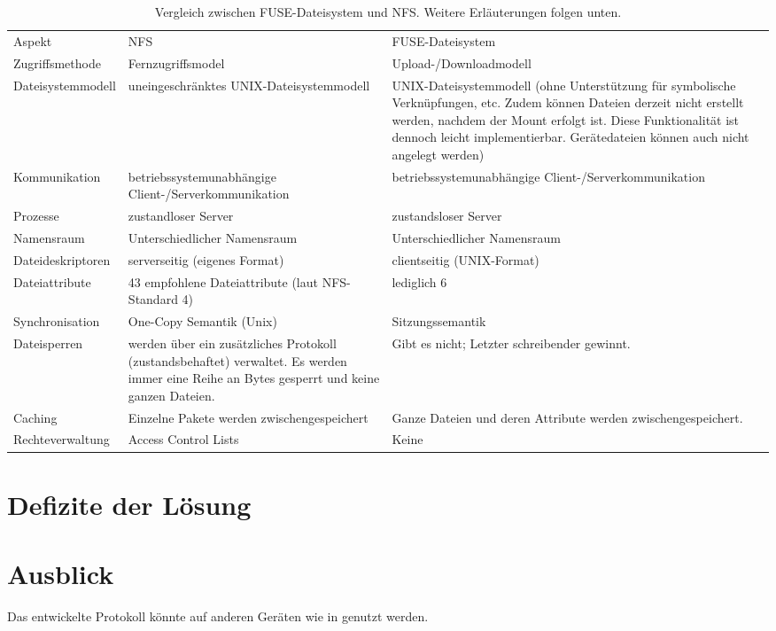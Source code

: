 \documentclass[
	10pt,			%
	a4paper,		%
	parskip=half,		%
	DIV=4,			%
	captions=nooneline,	%
	tablecaptionabove,	%
	bibliography=totoc,	%
	bibtotocnumbered,	%
	liststotocnumbered,	%
	headinclude,
	headsepline,		%
	1.6headlines,		%
	]
	{book}
\begin{document}
\begin{table}[H]
	\begin{tabu} to 
		\tableHeaderStyle
		Aspekt & NFS & FUSE-Dateisystem \\
		Zugriffsmethode & Fernzugriffsmodel & Upload-/Downloadmodell \\
		Dateisystemmodell & uneingeschränktes UNIX-Dateisystemmodell & UNIX-Dateisystemmodell (ohne Unterstützung für symbolische Verknüpfungen, etc. Zudem können Dateien derzeit nicht erstellt werden, nachdem der Mount erfolgt ist. Diese Funktionalität ist dennoch leicht implementierbar. Gerätedateien können auch nicht angelegt werden)\\
		Kommunikation & betriebssystemunabhängige Client-/Serverkommunikation & betriebssystemunabhängige Client-/Serverkommunikation \\
		Prozesse & zustandloser Server & zustandsloser Server \\
		Namensraum & Unterschiedlicher Namensraum & Unterschiedlicher Namensraum \\
		Dateideskriptoren & serverseitig (eigenes Format) & clientseitig (UNIX-Format) \\
		Dateiattribute & 43 empfohlene Dateiattribute (laut NFS-Standard 4) & lediglich 6 \\
		Synchronisation & One-Copy Semantik (Unix) & Sitzungssemantik \\
		Dateisperren & werden über ein zusätzliches Protokoll (zustandsbehaftet) verwaltet. Es werden immer eine Reihe an Bytes gesperrt und keine ganzen Dateien. & Gibt es nicht; Letzter schreibender gewinnt. \\
		Caching & Einzelne Pakete werden zwischengespeichert & Ganze Dateien und deren Attribute werden zwischengespeichert. \\
		Rechteverwaltung & Access Control Lists & Keine
	\end{tabu}
	
	\caption[Vergleich zwischen FUSE-Dateisystem und NFS]{Vergleich zwischen FUSE-Dateisystem und NFS. Weitere Erläuterungen folgen unten.}
	\label{tbl:comparison}
\end{table}



\section{Defizite der Lösung}

\section{Ausblick}
Das entwickelte Protokoll könnte auf anderen Geräten wie in \cite{VERSYS} genutzt werden.
\end{document}

